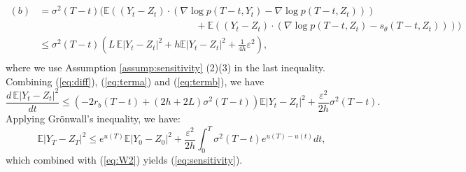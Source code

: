 \documentclass[letterpaper,10pt,reqno]{amsart}
\def\eqref#1{(\ref{#1})}
\numberwithin{equation}{section}
\begin{document}
\begin{equation}
\label{eq:termb}
\begin{aligned}
(b) & = \sigma^2(T-t) \bigg( \mathbb{E}((Y_t - Z_t) \cdot (\nabla \log p(T-t, Y_t) - \nabla \log p (T-t, Z_t))) \\
& \qquad \qquad \qquad \qquad \qquad \qquad \qquad \qquad + \mathbb{E}((Y_t - Z_t) \cdot (\nabla \log p (T-t, Z_t) - s_{\theta}(T-t, Z_t))) \bigg)\\
&  \le  \sigma^2(T-t) \left( L\, \mathbb{E}|Y_t - Z_t|^2 + h \mathbb{E}|Y_t - Z_t|^2 + \frac{1}{4h} \varepsilon^2\right), \\
\end{aligned}
\end{equation}
where we use Assumption \ref{assump:sensitivity} (2)(3) in the last inequality.
Combining \eqref{eq:diff}, \eqref{eq:terma} and \eqref{eq:termb}, we have
\begin{equation}
\label{eq:Gronwall}
\frac{d \, \mathbb{E}|Y_t - Z_t|^2}{dt} \le \left(-2 r_b(T-t) + (2h + 2L) \sigma^2(T-t) \right) \mathbb{E}|Y_t -Z_t|^2
+ \frac{\varepsilon^2}{2h} \sigma^2(T-t).
\end{equation}
Applying Gr\"onwall's inequality, we have:
\begin{equation*}
\mathbb{E}|Y_T - Z_T|^2\leq e^{u(T)}\mathbb{E}|Y_0 - Z_0|^2+ \frac{\varepsilon^2}{2h} \int_0^T \sigma^2(T-t) e^{u(T)-u(t)} dt,
\end{equation*}
which combined with \eqref{eq:W2} yields \eqref{eq:sensitivity}. 
\end{document}
